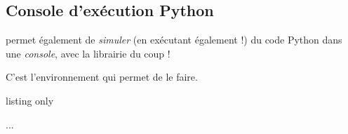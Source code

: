 %
%
%

\subsection{Console d'exécution Python}

\begin{tipblock}
 permet également de \textit{simuler} (en exécutant également !) du code \textsf{Python} dans une \textit{console}, avec la \textsf{librairie}  du coup !

C'est l'environnement  qui permet de le faire.
\end{tipblock}

\begin{PresCodeTexPL}{listing only}
\begin{ConsolePythontex}[clés]{} %
...
\end{ConsolePythontex}
\end{PresCodeTexPL}


